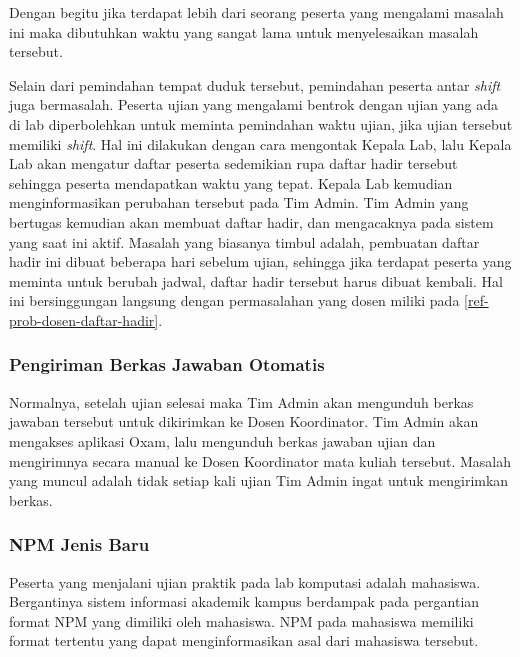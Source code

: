     Dengan begitu jika terdapat lebih dari seorang peserta yang mengalami
    masalah ini maka dibutuhkan waktu yang sangat lama untuk menyelesaikan
    masalah tersebut.
    
    Selain dari pemindahan tempat duduk tersebut, pemindahan peserta antar
    \textit{shift} juga bermasalah. Peserta ujian yang mengalami bentrok dengan
    ujian yang ada di lab diperbolehkan untuk meminta pemindahan waktu ujian,
    jika ujian tersebut memiliki \textit{shift}. Hal ini dilakukan dengan cara
    mengontak Kepala Lab, lalu Kepala Lab akan mengatur daftar peserta
    sedemikian rupa daftar hadir tersebut sehingga peserta mendapatkan waktu
    yang tepat. Kepala Lab kemudian menginformasikan perubahan tersebut pada Tim
    Admin. Tim Admin yang bertugas kemudian akan membuat daftar hadir, dan
    mengacaknya pada sistem yang saat ini aktif. Masalah yang biasanya timbul
    adalah, pembuatan daftar hadir ini dibuat beberapa hari sebelum ujian,
    sehingga jika terdapat peserta yang meminta untuk berubah jadwal, daftar
    hadir tersebut harus dibuat kembali. Hal ini bersinggungan langsung dengan
    permasalahan yang dosen miliki pada \ref{ref-prob-dosen-daftar-hadir}.

    \subsubsection{Pengiriman Berkas Jawaban
    Otomatis}\label{ref-prob-admin-pengiriman-berkas} 
    Normalnya, setelah ujian
    selesai maka Tim Admin akan mengunduh berkas jawaban tersebut untuk
    dikirimkan ke Dosen Koordinator. Tim Admin akan mengakses aplikasi Oxam,
    lalu mengunduh berkas jawaban ujian dan mengirimnya secara manual ke Dosen
    Koordinator mata kuliah tersebut. Masalah yang muncul adalah tidak setiap
    kali ujian Tim Admin ingat untuk mengirimkan berkas.
    
    \subsubsection{NPM Jenis Baru}\label{ref-prob-admin-npm-baru} 
    Peserta yang
    menjalani ujian praktik pada lab komputasi adalah mahasiswa. Bergantinya
    sistem informasi akademik kampus berdampak pada pergantian format NPM yang
    dimiliki oleh mahasiswa. NPM pada mahasiswa memiliki format tertentu yang
    dapat menginformasikan asal dari mahasiswa tersebut.

